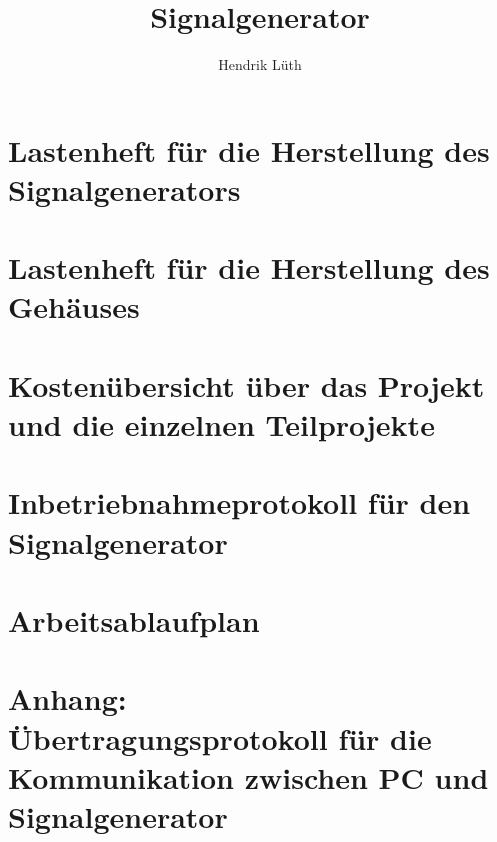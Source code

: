 \documentclass[a4paper,12pt]{book}
\title{Signalgenerator}
\author{Hendrik Lüth}
\begin{document}
\maketitle
\tableofcontents

\chapter{Lastenheft für die Herstellung des Signalgenerators}


\chapter{Lastenheft für die Herstellung des Gehäuses}


\chapter{Kostenübersicht über das Projekt und die einzelnen Teilprojekte}



\chapter{Inbetriebnahmeprotokoll für den Signalgenerator}



\chapter{Arbeitsablaufplan}



\chapter{Anhang: \\ Übertragungsprotokoll für die Kommunikation zwischen PC und Signalgenerator}

\end{document}
